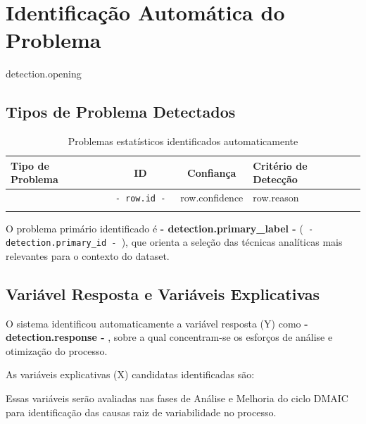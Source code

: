 \section{Identifica\c{c}\~{a}o Autom\'atica do Problema}

{{ detection.opening }}

\subsection{Tipos de Problema Detectados}

{%
\begin{table}[H]
\caption{Problemas estat\'isticos identificados automaticamente}
\label{tab:detection}
\centering
\begin{tabular}{p{6.5cm}ccp{5cm}}
\toprule
\textbf{Tipo de Problema} & \textbf{ID} & \textbf{Confian\c{c}a} & \textbf{Crit\'erio de Detec\c{c}\~{a}o} \\
\midrule
{%
{{ row.label }} & \texttt{ {{- row.id -}} } & {{ row.confidence }} & {{ row.reason }} \\
{%
\bottomrule
\end{tabular}
\end{table}
{%

O problema prim\'ario identificado \'e \textbf{ {{- detection.primary_label -}} }
(\texttt{ {{- detection.primary_id -}} }), que orienta a sele\c{c}\~{a}o das t\'ecnicas
anal\'iticas mais relevantes para o contexto do dataset.

\subsection{Vari\'avel Resposta e Vari\'aveis Explicativas}

O sistema identificou automaticamente a vari\'avel resposta (Y) como
\textbf{ {{- detection.response -}} }, sobre a qual concentram-se os esfor\c{c}os
de an\'alise e otimiza\c{c}\~{a}o do processo.

{%
As vari\'aveis explicativas (X) candidatas identificadas s\~{a}o:

Essas vari\'aveis ser\~{a}o avaliadas nas fases de An\'alise e Melhoria do ciclo
DMAIC para identifica\c{c}\~{a}o das causas raiz de variabilidade no processo.
{%

}}}}

